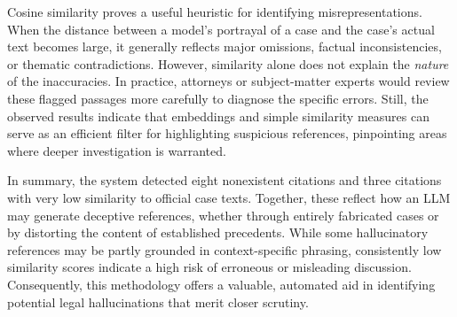 \documentclass[12pt]{article}
\begin{document}
Cosine similarity proves a useful heuristic for identifying misrepresentations. When the distance between a model's portrayal of a case and the case's actual text becomes large, it generally reflects major omissions, factual inconsistencies, or thematic contradictions. However, similarity alone does not explain the \emph{nature} of the inaccuracies. In practice, attorneys or subject-matter experts would review these flagged passages more carefully to diagnose the specific errors. Still, the observed results indicate that embeddings and simple similarity measures can serve as an efficient filter for highlighting suspicious references, pinpointing areas where deeper investigation is warranted.

In summary, the system detected eight nonexistent citations and three citations with very low similarity to official case texts. Together, these reflect how an LLM may generate deceptive references, whether through entirely fabricated cases or by distorting the content of established precedents. While some hallucinatory references may be partly grounded in context-specific phrasing, consistently low similarity scores indicate a high risk of erroneous or misleading discussion. Consequently, this methodology offers a valuable, automated aid in identifying potential legal hallucinations that merit closer scrutiny.
\end{document}
